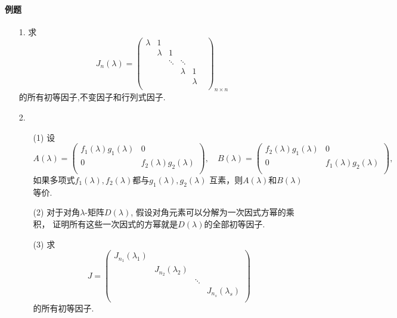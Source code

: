\paragraph{例题}
\begin{itemize}
    \item [1.] 求
    \begin{equation}
    \nonumber
    J_n(\lambda) = 
    \begin{pmatrix}
    \lambda&1&&&&\\
    &\lambda&1&&&\\
    &&\ddots&\ddots&&\\
    &&&\lambda&1\\
    &&&&\lambda\\
    \end{pmatrix}_{n\times n}
    \end{equation}
    的所有初等因子,不变因子和行列式因子.
    \vspace{3cm}

    \item [2.]
    \begin{itemize}
        \item [(1)] 设
    \begin{equation}
    \nonumber
    A(\lambda) = \begin{pmatrix}
        f_1(\lambda)g_1(\lambda)&0\\
        0&f_2(\lambda)g_2(\lambda)\\
    \end{pmatrix},\quad
    B(\lambda) = \begin{pmatrix}
        f_2(\lambda)g_1(\lambda)&0\\
        0&f_1(\lambda)g_2(\lambda)\\
    \end{pmatrix},
    \end{equation}
    如果多项式$f_1(\lambda),f_2(\lambda)$都与$g_1(\lambda),g_2(\lambda)$
    互素，则$A(\lambda)$和$B(\lambda)$等价.
    \vspace{3cm}
    
    \item [(2)] 对于对角$\lambda$-矩阵$D(\lambda)$, 假设对角元素可以分解为一次因式方幂的乘积，
    证明所有这些一次因式的方幂就是$D(\lambda)$的全部初等因子.
    \vspace{3cm}

    \item [(3)]
    求
    \begin{equation}
    \nonumber
    J = 
    \begin{pmatrix}
    J_{n_1}(\lambda_1)&&&\\
    &J_{n_2}(\lambda_2)&&\\
    &&\ddots&\\
    &&&J_{n_s}(\lambda_s)\\
    \end{pmatrix}
    \end{equation}
    的所有初等因子.
    \vspace{3cm}


\end{itemize}
\end{itemize}
